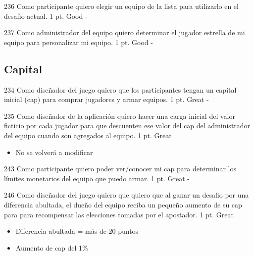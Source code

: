 \vspace{1cm}

\simplestory
{236}
{Como participante quiero elegir un equipo de la lista para utilizarlo en el desafìo actual.}
{1 pt.}
{Good}
{-}

\vspace{1cm}


\simplestory
{237}
{Como administrador del equipo quiero determinar el jugador estrella de mi equipo para personalizar mi equipo.}
{1 pt.}
{Good}
{-}

\vspace{1cm}



\subsection{Capital}

\simplestory
{234}
{Como diseñador del juego quiero que los participantes tengan un capital inicial (cap) para comprar jugadores y armar equipos.}
{1 pt.}
{Great}
{-}

\vspace{1cm}

\simplestory
{235}
{Como diseñador de la aplicación quiero hacer una carga inicial del valor ficticio por cada jugador para que descuenten ese valor del cap del administrador del equipo cuando son agregados al equipo.}
{1 pt.}
{Great}
{\begin{itemize}
\item No se volverá a modificar
\end{itemize}}

\vspace{1cm}

\simplestory
{243}
{Como participante quiero poder ver/conocer mi cap para determinar los límites monetarios del equipo que puedo armar.}
{1 pt.}
{Great}
{-}

\vspace{1cm}

\simplestory
{246}
{Como diseñador del juego quiero que quiero que al ganar un desafio por una diferencia abultada, el dueño del equipo reciba un pequeño aumento de su cap para para recompensar las elecciones tomadas por el apostador.}
{1 pt.}
{Great}
{\begin{itemize}
\item Diferencia abultada = más de 20 puntos
\item Aumento de cap del 1\%
\end{itemize}}

